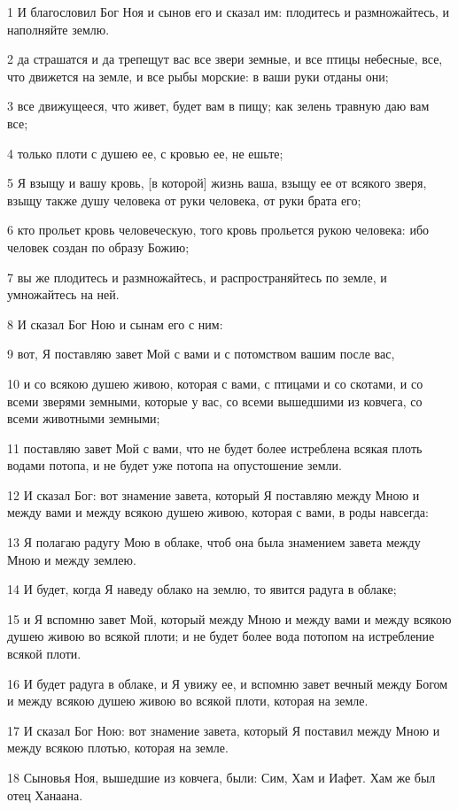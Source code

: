 \par 1 И благословил Бог Ноя и сынов его и сказал им: плодитесь и размножайтесь, и наполняйте землю.
\par 2 да страшатся и да трепещут вас все звери земные, и все птицы небесные, все, что движется на земле, и все рыбы морские: в ваши руки отданы они;
\par 3 все движущееся, что живет, будет вам в пищу; как зелень травную даю вам все;
\par 4 только плоти с душею ее, с кровью ее, не ешьте;
\par 5 Я взыщу и вашу кровь, [в которой] жизнь ваша, взыщу ее от всякого зверя, взыщу также душу человека от руки человека, от руки брата его;
\par 6 кто прольет кровь человеческую, того кровь прольется рукою человека: ибо человек создан по образу Божию;
\par 7 вы же плодитесь и размножайтесь, и распространяйтесь по земле, и умножайтесь на ней.
\par 8 И сказал Бог Ною и сынам его с ним:
\par 9 вот, Я поставляю завет Мой с вами и с потомством вашим после вас,
\par 10 и со всякою душею живою, которая с вами, с птицами и со скотами, и со всеми зверями земными, которые у вас, со всеми вышедшими из ковчега, со всеми животными земными;
\par 11 поставляю завет Мой с вами, что не будет более истреблена всякая плоть водами потопа, и не будет уже потопа на опустошение земли.
\par 12 И сказал Бог: вот знамение завета, который Я поставляю между Мною и между вами и между всякою душею живою, которая с вами, в роды навсегда:
\par 13 Я полагаю радугу Мою в облаке, чтоб она была знамением завета между Мною и между землею.
\par 14 И будет, когда Я наведу облако на землю, то явится радуга в облаке;
\par 15 и Я вспомню завет Мой, который между Мною и между вами и между всякою душею живою во всякой плоти; и не будет более вода потопом на истребление всякой плоти.
\par 16 И будет радуга в облаке, и Я увижу ее, и вспомню завет вечный между Богом и между всякою душею живою во всякой плоти, которая на земле.
\par 17 И сказал Бог Ною: вот знамение завета, который Я поставил между Мною и между всякою плотью, которая на земле.
\par 18 Сыновья Ноя, вышедшие из ковчега, были: Сим, Хам и Иафет. Хам же был отец Ханаана.
